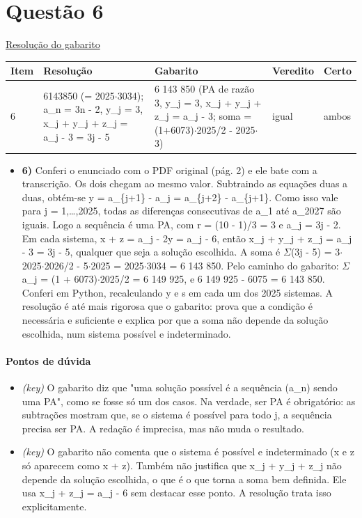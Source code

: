 \documentclass{article}%
\begin{document}
\section*{Questão 6}%
\href{https://poliedroresolve.sistemapoliedro.com.br/vestibulares/ime/2026/ime-2-fase-dia-1-23-10-2025-2-fase-dia-1/dissertativa-6-matematica-2-fase-dia-1-ime-2026}{Resolução do gabarito}\par\smallskip%
\begin{longtable}{@{}p{} p{} p{} p{} p{}@{}}\toprule Item & Resolução & Gabarito & Veredito & Certo \\ \midrule
6 & 6143850 (= 2025$\cdot$3034); a\_n = 3n - 2, y\_j = 3, x\_j + y\_j + z\_j = a\_j - 3 = 3j - 5 & 6 143 850 (PA de razão 3, y\_j = 3, x\_j + y\_j + z\_j = a\_j - 3; soma = (1+6073)$\cdot$2025/2 - 2025$\cdot$3) & igual & ambos \\
\bottomrule\end{longtable}%
\begin{itemize}%
\item%
\textbf{6)} Conferi o enunciado com o PDF original (pág. 2) e ele bate com a transcrição. Os dois chegam ao mesmo valor. Subtraindo as equações duas a duas, obtém{-}se y = a\_\{j+1\} - a\_j = a\_\{j+2\} - a\_\{j+1\}. Como isso vale para j = 1,\ldots{},2025, todas as diferenças consecutivas de a\_1 até a\_2027 são iguais. Logo a sequência é uma PA, com r = (10 - 1)/3 = 3 e a\_j = 3j - 2. Em cada sistema, x + z = a\_j - 2y = a\_j - 6, então x\_j + y\_j + z\_j = a\_j - 3 = 3j - 5, qualquer que seja a solução escolhida. A soma é $\Sigma$(3j - 5) = 3$\cdot$2025$\cdot$2026/2 - 5$\cdot$2025 = 2025$\cdot$3034 = 6 143 850. Pelo caminho do gabarito: $\Sigma$a\_j = (1 + 6073)$\cdot$2025/2 = 6 149 925, e 6 149 925 - 6075 = 6 143 850. Conferi em Python, recalculando y e s em cada um dos 2025 sistemas. A resolução é até mais rigorosa que o gabarito: prova que a condição é necessária e suficiente e explica por que a soma não depende da solução escolhida, num sistema possível e indeterminado.%
\end{itemize}%
\paragraph{Pontos de dúvida}%
\begin{itemize}%
\item%
\textit{(key)} O gabarito diz que "uma solução possível é a sequência (a\_n) sendo uma PA", como se fosse só um dos casos. Na verdade, ser PA é obrigatório: as subtrações mostram que, se o sistema é possível para todo j, a sequência precisa ser PA. A redação é imprecisa, mas não muda o resultado.%
\item%
\textit{(key)} O gabarito não comenta que o sistema é possível e indeterminado (x e z só aparecem como x + z). Também não justifica que x\_j + y\_j + z\_j não depende da solução escolhida, o que é o que torna a soma bem definida. Ele usa x\_j + z\_j = a\_j - 6 sem destacar esse ponto. A resolução trata isso explicitamente.%
\end{itemize}%
\end{document}

